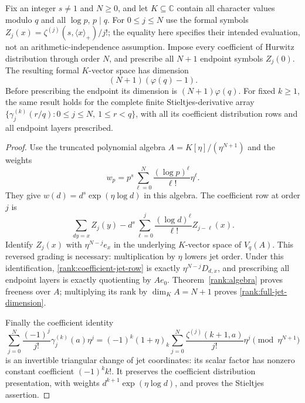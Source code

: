 \begin{corollary}\label{rank:full-jets}
Fix an integer $s\ne1$ and $N\geq0$, and let $K\subseteq\mathbb C$
contain all character values modulo $q$ and all $\log p$, $p\mid q$.
For $0\leq j\leq N$ use the formal symbols
$Z_j(x)=\zeta^{(j)}(s,\langle x\rangle_+)/j!$; the equality here
specifies their intended evaluation, not an arithmetic-independence
assumption.  Impose every coefficient of Hurwitz distribution through
order $N$, and prescribe all $N+1$ endpoint symbols $Z_j(0)$.
The resulting formal $K$-vector space has dimension
\begin{equation}\label{rank:full-jet-dimension}
 (N+1)(\varphi(q)-1).
\end{equation}
Before prescribing the endpoint its dimension is $(N+1)\varphi(q)$.
For fixed $k\geq1$, the same result holds for the complete finite
Stieltjes-derivative array
$\{\gamma_j^{(k)}(r/q):0\leq j\leq N,\ 1\leq r<q\}$,
with all its coefficient distribution rows and all endpoint layers
prescribed.
\end{corollary}
\begin{proof}
Use the truncated polynomial algebra $A=K[\eta]/(\eta^{N+1})$ and
the weights
\[
 w_p=p^s\sum_{\ell=0}^N\frac{(\log p)^\ell}{\ell!}\eta^\ell.
\]
They give $w(d)=d^s\exp(\eta\log d)$ in this algebra.  The coefficient
row at order $j$ is
\begin{equation}\label{rank:coefficient-jet-row}
 \sum_{dy=x}Z_j(y)
 -d^s\sum_{\ell=0}^j
       \frac{(\log d)^\ell}{\ell!}Z_{j-\ell}(x).
\end{equation}
Identify $Z_j(x)$ with $\eta^{N-j}e_x$ in the underlying $K$-vector
space of $V_q(A)$.  This reversed grading is necessary: multiplication
by $\eta$ lowers jet order.  Under this identification,
\eqref{rank:coefficient-jet-row} is exactly $\eta^{N-j}D_{d,x}$,
and prescribing all endpoint layers is exactly quotienting by $Ae_0$.
Theorem~\ref{rank:algebra} proves freeness over $A$; multiplying its
rank by $\dim_K A=N+1$ proves \eqref{rank:full-jet-dimension}.

Finally the coefficient identity
\[
 \sum_{j=0}^N\frac{(-1)^j}{j!}\gamma_j^{(k)}(a)\eta^j
 =(-1)^k(1+\eta)_k
       \sum_{j=0}^N\frac{\zeta^{(j)}(k+1,a)}{j!}\eta^j
       \pmod{\eta^{N+1}}
\]
is an invertible triangular change of jet coordinates: its scalar
factor has nonzero constant coefficient $(-1)^k k!$.  It preserves
the coefficient distribution presentation, with weights
$d^{k+1}\exp(\eta\log d)$, and proves the Stieltjes assertion.
\end{proof}

